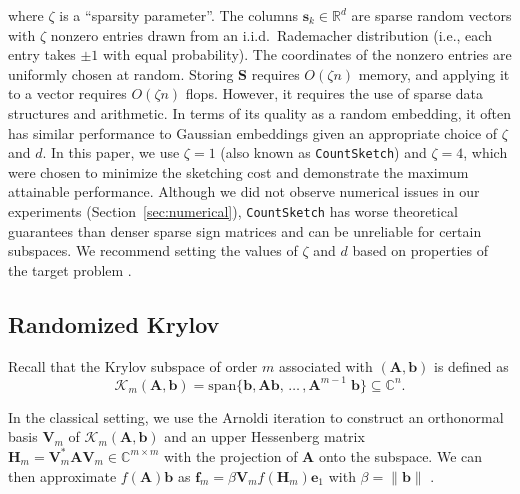 \documentclass[smallextended]{svjour3}
\renewcommand{\vec}[1]{\mathbf{#1}}
\newcommand{\mat}[1]{\mathbf{#1}}
\newcommand{\norm}[1]{\| #1 \|}
\begin{document}
where $\zeta$ is a ``sparsity parameter''. The columns $\vec{s}_k \in \mathbb{R}^{d}$ are sparse random vectors with $\zeta$ nonzero entries drawn from an i.i.d.~Rademacher distribution (i.e., each entry takes $\pm 1$ with equal probability). The coordinates of the nonzero entries are uniformly chosen at random. Storing $\mat{S}$ requires $O(\zeta n)$ memory, and applying it to a vector requires $O(\zeta n)$ flops. However, it requires the use of sparse data structures and arithmetic. In terms of its quality as a random embedding, it often has similar performance to Gaussian embeddings \cite{martinsson_randomized_2020} given an appropriate choice of $\zeta$ and $d$. In this paper, we use $\zeta = 1$ (also known as \texttt{CountSketch}) and $\zeta = 4$, which were chosen to minimize the sketching cost and demonstrate the maximum attainable performance. Although we did not observe numerical issues in our experiments (Section~\ref{sec:numerical}), \texttt{CountSketch} has worse theoretical guarantees than denser sparse sign matrices and can be unreliable for certain subspaces. We recommend setting the values of $\zeta$ and $d$ based on properties of the target problem \cite{cohen_nearly_2016,li_lower_2021,martinsson_randomized_2020,tropp_streaming_2019,woodruff_sketching_2014}.

\subsection{Randomized Krylov}
\label{subsec:rand_krylov}

Recall that the Krylov subspace of order $m$ associated with $(\mat{A}, \vec{b})$ is defined as
\begin{equation}
\label{eq:krylov_def}
\mathcal{K}_m(\mat{A}, \vec{b}) = \text{span} \{\vec{b}, \mat{A} \vec{b}, \, \ldots \,, \mat{A}^{m - 1} \; \vec{b} \} \subseteq \mathbb{C}^{n}.
\end{equation}

In the classical setting, we use the Arnoldi iteration to construct an orthonormal basis $\mat{V}_m$ of $\mathcal{K}_m(\mat{A}, \vec{b})$ and an upper Hessenberg matrix $\mat{H}_m = \mat{V}_m^* \mat{A} \mat{V}_m \in \mathbb{C}^{m \times m}$ with the projection of $\mat{A}$ onto the subspace. We can then approximate $f(\mat{A})\vec{b}$ as $\vec{f}_m = \beta \mat{V}_m f(\mat{H}_m) \vec{e}_1$ with $\beta = \norm{\vec{b}}$ \cite{afanasjew_implementation_2008,eiermann_restarted_2006,eiermann_deflated_2011}.
\end{document}
